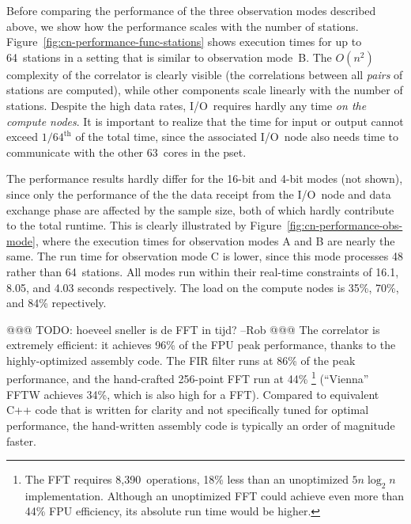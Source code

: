\documentclass[10pt]{article}
\begin{document}
Before comparing the performance of the three observation modes described
above, we show how the performance scales with the number of stations.
Figure~\ref{fig:cn-performance-func-stations} shows execution times for up to
64~stations in a setting that is similar to observation mode~\textsf{B}.
The $O(n^2)$ complexity of the correlator is clearly visible (the correlations
between all \emph{pairs\/} of stations are computed), while other
components scale linearly with the number of stations.
Despite the high data rates, I/O~requires hardly any time \emph{on the compute nodes}.
It is important to realize that the time for input or output cannot exceed $1/64^\mathrm{th}$
of the total time, since the associated I/O~node also needs time to communicate
with the other 63~cores in the pset.


The performance results hardly differ for the 16-bit and 4-bit modes (not shown),
since only the performance of the the data receipt from the I/O~node and data
exchange phase are affected by the sample size, 
both of which hardly contribute to the total runtime.
This is clearly illustrated by Figure~\ref{fig:cn-performance-obs-mode},
where the execution times for observation modes \textsf{A} and \textsf{B}
are nearly the same.
The run time for observation mode \textsf{C} is lower, since this mode
processes 48 rather than 64~stations.
All modes run within their real-time constraints of 16.1, 8.05, and 4.03
seconds respectively.
The load on the compute nodes is 35\%, 70\%, and 84\% repectively.

@@@ TODO: hoeveel sneller is de FFT in tijd? --Rob @@@
The correlator is extremely efficient: it achieves 96\% of the FPU peak
performance, thanks to the highly-optimized assembly code.
The FIR filter runs at 86\% of the peak performance, and the hand-crafted
256-point FFT run at 44\%%
\footnote{The FFT requires 8,390~operations, 18\% less than an unoptimized
$5n \log_2 n$ implementation.  Although an unoptimized FFT could achieve even
more than 44\% FPU efficiency, its absolute run time would be higher.}
(``Vienna'' FFTW achieves 34\%, which is also high for a FFT).
Compared to equivalent C++ code that is written for clarity and not
specifically tuned for optimal performance, the hand-written assembly code is
typically an order of magnitude faster.
\end{document}
